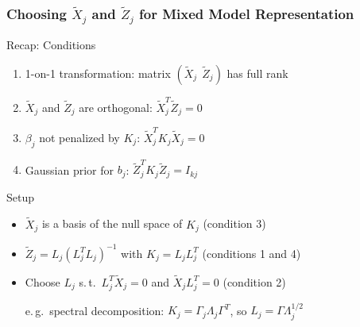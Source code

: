 \documentclass[final]{beamer}
\begin{document}
\begin{frame}
\frametitle{Choosing $\tilde{X}_j$ and $\tilde{Z}_j$ for Mixed Model Representation}

\begin{block}{\small Recap: Conditions}
\small
\begin{enumerate}
\itemsep0em 
\item 1-on-1 transformation: matrix $(\tilde{X}_j \:\:  \tilde{Z}_j)$ has full rank
\item $\tilde{X}_j$ and $\tilde{Z}_j$ are orthogonal: $\tilde{X}_j^T \tilde{Z}_j = 0$
\item $\beta_j$ not penalized by $K_j$: $\tilde{X}_j^T K_j \tilde{X}_j = 0$
\item Gaussian prior for $b_j$: $\tilde{Z}_j^T K_j \tilde{Z}_j = I_{kj}$
\end{enumerate}
\end{block}
\vspace{-1em}
\begin{block}{Setup}
\begin{itemize}
\item $\tilde{X}_j$ is a basis of the null space of $K_j$ (condition 3)
\item $\tilde{Z}_j =L_j (L_j^T L_j)^{-1}$ with $K_j =L_j L_j^T$ (conditions 1 and 4)
\item Choose $L_j$ s.\,t.\ $L_j^T\tilde{X}_j = 0$ and $\tilde{X}_jL_j^T = 0$ (condition 2)

e.\,g.\ spectral decomposition: 
$K_j = \Gamma_j \Lambda_j \Gamma^T$, so $L_j = \Gamma \Lambda_j^{1/2}$
\end{itemize}
\end{block}

\end{frame}
\end{document}

